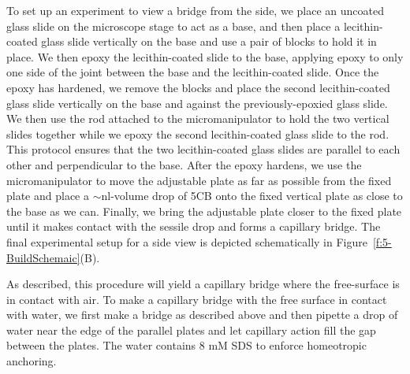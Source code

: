 To set up an experiment to view a bridge from the side, we place an uncoated glass slide on the microscope stage to act as a base, and then place a lecithin-coated glass slide vertically on the base and use a pair of blocks to hold it in place.
We then epoxy the lecithin-coated slide to the base, applying epoxy to only one side of the joint between the base and the lecithin-coated slide.
Once the epoxy has hardened, we remove the blocks and place the second lecithin-coated glass slide vertically on the base and against the previously-epoxied glass slide.
We then use the rod attached to the micromanipulator to hold the two vertical slides together while we epoxy the second lecithin-coated glass slide to the rod.
This protocol ensures that the two lecithin-coated glass slides are parallel to each other and perpendicular to the base.
After the epoxy hardens, we use the micromanipulator to move the adjustable plate as far as possible from the fixed plate and place a $\sim$nl-volume drop of 5CB onto the fixed vertical plate as close to the base as we can.
Finally, we bring the adjustable plate closer to the fixed plate until it makes contact with the sessile drop and forms a capillary bridge.
The final experimental setup for a side view is depicted schematically in Figure~\ref{f:5-BuildSchemaic}(B).

As described, this procedure will yield a capillary bridge where the free-surface is in contact with air.
To make a capillary bridge with the free surface in contact with water, we first make a bridge as described above and then pipette a drop of water near the edge of the parallel plates and let capillary action fill the gap between the plates.
The water contains 8 mM SDS to enforce homeotropic anchoring.




